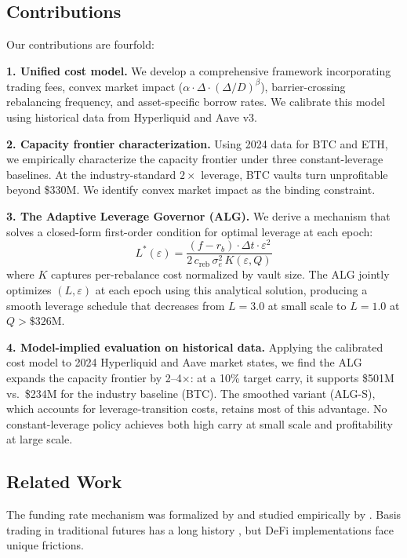 \documentclass[11pt]{article}
\begin{document}
\subsection{Contributions}

Our contributions are fourfold:

\textbf{1. Unified cost model.} We develop a comprehensive framework incorporating trading fees, convex market impact ($\alpha \cdot \Delta \cdot (\Delta/D)^\beta$), barrier-crossing rebalancing frequency, and asset-specific borrow rates. We calibrate this model using historical data from Hyperliquid and Aave v3.

\textbf{2. Capacity frontier characterization.} Using 2024 data for BTC and ETH, we empirically characterize the capacity frontier under three constant-leverage baselines. At the industry-standard $2\times$ leverage, BTC vaults turn unprofitable beyond \$330M. We identify convex market impact as the binding constraint.

\textbf{3. The Adaptive Leverage Governor (ALG).} We derive a mechanism that solves a closed-form first-order condition for optimal leverage at each epoch:
\begin{equation}
L^*(\varepsilon) = \frac{(f - r_b) \cdot \Delta t \cdot \varepsilon^2}{2 \, c_{\text{reb}} \, \sigma_e^2 \, K(\varepsilon, Q)}
\label{eq:foc}
\end{equation}
where $K$ captures per-rebalance cost normalized by vault size. The ALG jointly optimizes $(L, \varepsilon)$ at each epoch using this analytical solution, producing a smooth leverage schedule that decreases from $L = 3.0$ at small scale to $L = 1.0$ at $Q > \$326$M.

\textbf{4. Model-implied evaluation on historical data.} Applying the calibrated cost model to 2024 Hyperliquid and Aave market states, we find the ALG expands the capacity frontier by 2--4$\times$: at a 10\% target carry, it supports \$501M vs.\ \$234M for the industry baseline (BTC). The smoothed variant (ALG-S), which accounts for leverage-transition costs, retains most of this advantage. No constant-leverage policy achieves both high carry at small scale and profitability at large scale.

\subsection{Related Work}

The funding rate mechanism was formalized by \citet{perpetuals_mechanism} and studied empirically by \citet{alexander2020bitmex}. Basis trading in traditional futures has a long history \citep{brennan1958supply, routledge2000equilibrium}, but DeFi implementations face unique frictions.
\end{document}
